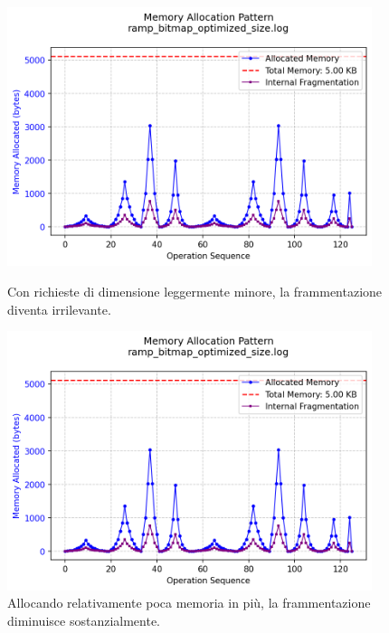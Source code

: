 \begin{figure}[H]
  \centering
  \begin{minipage}{0.5\textwidth}
    \centering
    \includegraphics[width=0.95\textwidth]{graphs/ramp_bitmap_optimized_size.png}
    \caption{Con richieste di dimensione leggermente minore, la frammentazione diventa irrilevante.}
    \label{fig:ramp_bitmap_optimized_size}
  \end{minipage}\hfill
  \begin{minipage}{0.5\textwidth}
    \centering
    \includegraphics[width=0.95\textwidth]{graphs/ramp_bitmap_optimized_size.png}
    \caption{Allocando relativamente poca memoria in più, la frammentazione diminuisce sostanzialmente.}
    \label{fig:ramp_bitmap_optimized_size}
  \end{minipage}
\end{figure}


